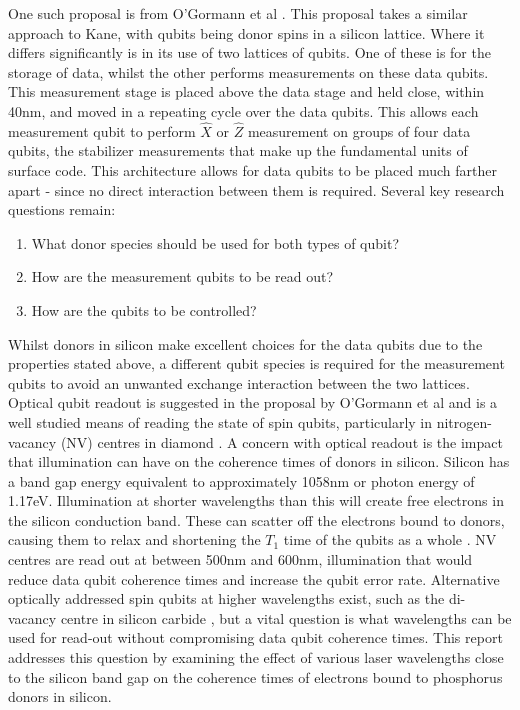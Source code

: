 One such proposal is from O'Gormann et al \cite{OGorman2014}. 
This proposal takes a similar approach to Kane, with qubits being donor spins in a silicon lattice. 
Where it differs significantly is in its use of two lattices of qubits. 
One of these is for the storage of data, whilst the other performs measurements on these data qubits. 
This measurement stage is placed above the data stage and held close, within 40nm, and moved in a repeating cycle over the data qubits.
This allows each measurement qubit to perform $\hat{X}$ or $\hat{Z}$ measurement on groups of four data qubits, the stabilizer measurements that make up the fundamental units of surface code.
This architecture allows for data qubits to be placed much farther apart - since no direct interaction between them is required.
Several key research questions remain:
\begin{enumerate}
	\item{What donor species should be used for both types of qubit?}
	\item{How are the measurement qubits to be read out?}
	\item{How are the qubits to be controlled?}
\end{enumerate}
Whilst donors in silicon make excellent choices for the data qubits due to the properties stated above, a different qubit species is required for the measurement qubits to avoid an unwanted exchange interaction between the two lattices.
Optical qubit readout is suggested in the proposal by O'Gormann et al and is a well studied means of reading the state of spin qubits, particularly in nitrogen-vacancy (NV) centres in diamond \cite{Liu2017}.
A concern with optical readout is the impact that illumination can have on the coherence times of donors in silicon. 
Silicon has a band gap energy equivalent to approximately 1058nm or photon energy of 1.17eV. 
Illumination at shorter wavelengths than this will create free electrons in the silicon conduction band.
These can scatter off the electrons bound to donors, causing them to relax and shortening the $T_1$ time of the qubits as a whole \cite{Ross2017a}.
NV centres are read out at between 500nm and 600nm, illumination that would reduce data qubit coherence times and increase the qubit error rate. 
Alternative optically addressed spin qubits at higher wavelengths exist, such as the di-vacancy centre in silicon carbide \cite{Christle2014}, but a vital question is what wavelengths can be used for read-out without compromising data qubit coherence times.
This report addresses this question by examining the effect of various laser wavelengths close to the silicon band gap on the coherence times of electrons bound to phosphorus donors in silicon.
